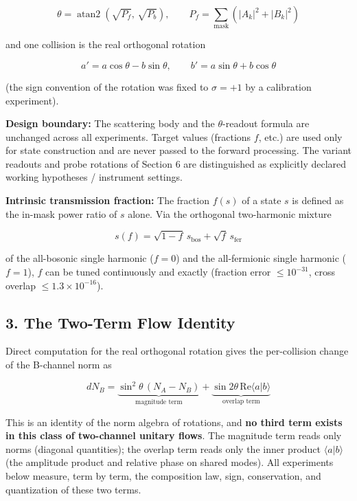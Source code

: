 \documentclass[
  a4paper,
]{article}
\begin{document}
\[
\theta=\operatorname{atan2}\!\left(\sqrt{P_f},\,\sqrt{P_b}\right),
\qquad
P_f=\sum_{\text{mask}}\left(|A_k|^2+|B_k|^2\right)
\]

and one collision is the real orthogonal rotation

\[
a'=a\cos\theta-b\sin\theta,
\qquad
b'=a\sin\theta+b\cos\theta
\]

(the sign convention of the rotation was fixed to \(\sigma=+1\) by a
calibration experiment).

\textbf{Design boundary:} The scattering body and the \(\theta\)-readout
formula are unchanged across all experiments. Target values (fractions
\(f\), etc.) are used only for state construction and are never passed
to the forward processing. The variant readouts and probe rotations of
Section 6 are distinguished as explicitly declared working hypotheses /
instrument settings.

\textbf{Intrinsic transmission fraction:} The fraction \(f(s)\) of a
state \(s\) is defined as the in-mask power ratio of \(s\) alone. Via
the orthogonal two-harmonic mixture

\[
s(f)=\sqrt{1-f}\,s_{\mathrm{bos}}+\sqrt{f}\,s_{\mathrm{fer}}
\]

of the all-bosonic single harmonic (\(f=0\)) and the all-fermionic
single harmonic (\(f=1\)), \(f\) can be tuned continuously and exactly
(fraction error \(\le 10^{-31}\), cross overlap
\(\le 1.3\times10^{-16}\)).

\subsection{3. The Two-Term Flow
Identity}\label{the-two-term-flow-identity}

Direct computation for the real orthogonal rotation gives the
per-collision change of the B-channel norm as

\[
\boxed{
dN_B
=\underbrace{\sin^2\theta\,(N_A-N_B)}_{\text{magnitude term}}
+\underbrace{\sin 2\theta\,\mathrm{Re}\langle a|b\rangle}_{\text{overlap term}}
}
\]

This is an identity of the norm algebra of rotations, and \textbf{no
third term exists in this class of two-channel unitary flows}. The
magnitude term reads only norms (diagonal quantities); the overlap term
reads only the inner product \(\langle a|b\rangle\) (the amplitude
product and relative phase on shared modes). All experiments below
measure, term by term, the composition law, sign, conservation, and
quantization of these two terms.
\end{document}
